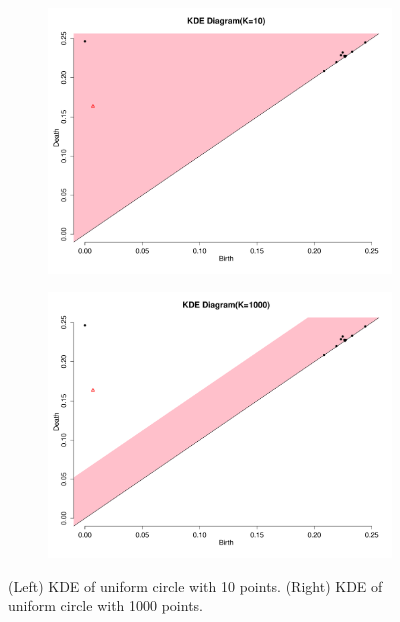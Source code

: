 \documentclass[a4paper]{article}
\begin{document}
\begin{figure}[htp!]
\centering
\begin{subfigure}{.5\textwidth}
  \centering
  \includegraphics[width=\linewidth]{KDE-K10}
\end{subfigure}%
\begin{subfigure}{.5\textwidth}
  \centering
  \includegraphics[width=\linewidth]{KDE-k1000}
\end{subfigure}
\caption{(Left) KDE of uniform circle with 10 points. (Right) KDE of uniform circle with 1000 points.}
\end{figure}
\end{document}
